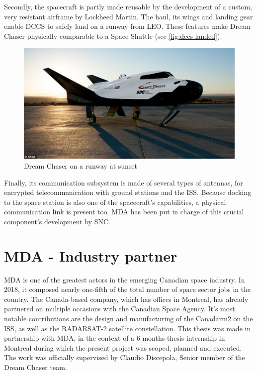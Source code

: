 Secondly, the  spacecraft is partly made reusable by the development of a custom, very resistant airframe by Lockheed Martin. The haul, its wings and landing gear enable \gls{DCCS} to safely land on a runway from \gls{LEO}. These features make Dream Chaser physically comparable to a Space Shuttle (see \autoref{fig:dccs-landed}). 
\begin{figure}[H]
	\centering
	\includegraphics[width=0.9\linewidth, keepaspectratio]{art/dream-chaser-landed.jpg}
	\caption{Dream Chaser on a runway at sunset \cite{misc:dccs-landed}}
	\label{fig:dccs-landed}
\end{figure}
Finally, its communication subsystem is made of several types of antennas, for encrypted telecommunication with ground stations and the \gls{ISS}. Because docking to the space station is also one of the spacecraft's capabilities, a physical communication link is present too. \gls{MDA} has been put in charge of this crucial component's development by \gls{SNC}. 

\section{MDA - Industry partner}
\gls{MDA} is one of the greatest actors in the emerging Canadian space industry. In 2018, it composed nearly one-fifth of the total number of space sector jobs in the country\cite{online:mda-front-page}\cite{misc:canada-space-industry-report}. The Canada-based company, which has offices in Montreal, has already partnered on multiple occasions with the Canadian Space Agency. It's most notable contributions are the design and manufacturing of the Canadarm2 on the \gls{ISS}, as well as the RADARSAT-2 satellite constellation. This thesis was made in partnership with \gls{MDA}, in the context of a 6 months thesis-internship in Montreal during which the present project was scoped, planned and executed. The work was officially supervised by Claudio Discepola, Senior member of the Dream Chaser team. 

